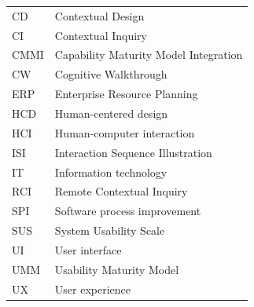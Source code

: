 \documentclass[12pt,a4paper,oneside,pdftex]{report}
\begin{document}
\noindent
\begin{longtable}{@{}p{}p{}@{}}
CD & Contextual Design \\
CI & Contextual Inquiry \\
CMMI & Capability Maturity Model Integration \\
CW & Cognitive Walkthrough\\
ERP & Enterprise Resource Planning \\
HCD & Human-centered design \\
HCI & Human-computer interaction \\
ISI & Interaction Sequence Illustration \\
IT & Information technology \\
RCI & Remote Contextual Inquiry \\
SPI & Software process improvement\\
SUS & System Usability Scale \\
UI & User interface \\
UMM & Usability Maturity Model \\
UX & User experience \\





\end{longtable}


\cleardoublepage
\tableofcontents

\end{document}
